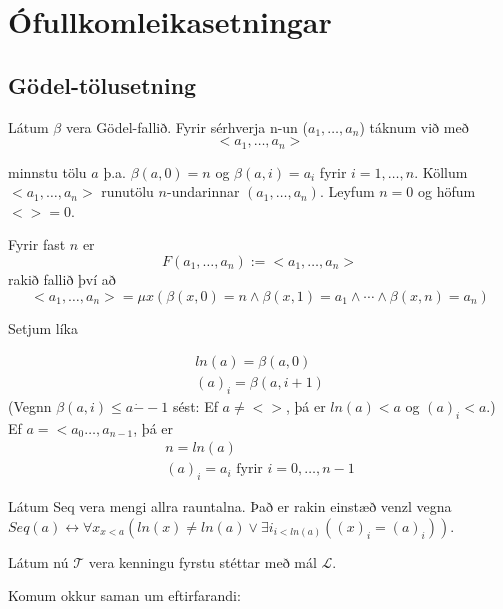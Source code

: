 \documentclass[12pt]{book}
\newcommand{\cT}{\mathcal{T}}
\newcommand{\cL}{\mathcal{L}}
\newcommand{\aan}{a_1, \dotsc, a_n}
\newcommand{\dda}{\dot{-}}
\begin{document}
\chapter{Ófullkomleikasetningar}

\section{Gödel-tölusetning}

Látum $\beta$ vera Gödel-fallið. Fyrir sérhverja 
n-un ($\aan$) táknum við með
\[< \aan > \]

minnstu tölu $a$ þ.a. $\beta(a,0) = n$ og 
$\beta(a,i) = a_i$ fyrir $i = 1, \dotsc, n$. Köllum
$<\aan>$ runutölu $n$-undarinnar
$(\aan)$. Leyfum $n=0$ og höfum $<> = 0$.

Fyrir fast $n$ er 
\[ F(\aan) := < \aan>\]
rakið fallið því að
\[< \aan> = \mu x(\beta(x,0) = n \wedge \beta(x,1) = a_1 \wedge \dotsb \wedge \beta(x,n) = a_n )\]

Setjum líka

\begin{gather*}
  ln(a) = \beta(a,0)\\
  (a)_i = \beta(a,i+1)
\end{gather*}
(Vegnn $\beta(a,i) \leq a \dda -1$ sést:
Ef $a \neq < >$, þá er $ln(a) < a$ og $(a)_i < a$.)
Ef $a = < a_0 \dotsc, a_{n-1}$, þá er
\begin{gather*}
  n = ln(a)\\
  (a)_i = a_i \text{ fyrir } i = 0, \dotsc, n-1
\end{gather*}

Látum Seq vera mengi allra rauntalna. Það er rakin einstæð venzl vegna
$Seq(a) \leftrightarrow \forall x_{x < a} ( ln(x) \neq ln(a) \vee \exists i_{i < ln(a)} ((x)_i = (a)_i))$.

Látum nú $\cT$ vera kenningu fyrstu stéttar með mál $\cL$.

Komum okkur saman um eftirfarandi:
\end{document}
